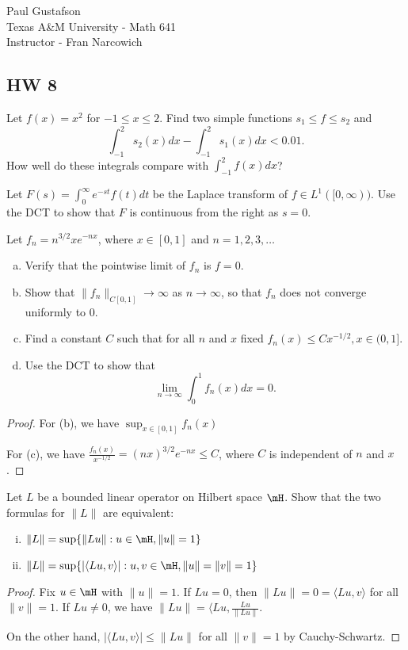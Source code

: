 \documentclass{article}
\begin{document}
\noindent Paul Gustafson\\
\noindent Texas A\&M University - Math 641\\ 
\noindent Instructor - Fran Narcowich

\subsection*{HW 8}
  Let $f(x) = x^2$ for $-1 \le x \le 2$. Find two simple functions $s_1 \le f \le s_2$ and
$$ \int_{-1}^2 s_2(x) dx - \int_{-1}^2 s_1(x) dx < 0.01.$$
How well do these integrals compare with $\int_{-1}^2 f(x)dx$?

 Let $F(s) = \int_0^\infty e^{-st} f(t) dt$ be the Laplace transform of $f \in L^1([0,\infty))$. Use the DCT to show that $F$ is continuous from the right as $s = 0$.

 Let $f_n = n^{3/2} x e^{-nx}$, where $x \in [0,1]$ and $n = 1,2,3, \ldots$
\begin{enumerate}[a.]
\item Verify that the pointwise limit of $f_n$ is $f = 0$.
\item Show that $\|f_n\|_{C[0,1]} \to \infty $ as $n \to \infty$, so that $f_n$ does not converge uniformly to $0$.
\item Find a constant $C$ such that for all $n$ and $x$ fixed $f_n(x) \le C x^{-1/2}, x \in (0,1]$.
\item Use the DCT to show that 
$$\lim_{n \to \infty} \int_0^1 f_n(x) dx = 0.$$
\end{enumerate}
\begin{proof}
For (b), we have $\sup_{x \in [0,1]} f_n(x)$  

For (c), we have $\frac {f_n(x)} {x^{-1/2}} = (nx)^{3/2} e^{-nx} \le C$, where $C$ is independent of $n$ and $x$.
\end{proof}

 Let $L$ be a bounded linear operator on Hilbert space $\mH$. Show that the two formulas for $\|L\|$ are equivalent:
\begin{enumerate}[i.]
\item $\|L\| = \sup\{\|Lu\| : u \in \mH, \|u\| = 1\}$
\item $\|L\| = \sup\{|\langle Lu, v \rangle| : u, v \in \mH, \|u\| = \|v\| = 1 \}$
\end{enumerate}

\begin{proof}
Fix $u \in \mH$ with $\|u\| = 1$.  If $Lu = 0$, then $\|Lu\| = 0 = \langle Lu, v \rangle$ for all $\|v\| = 1$. If $Lu \neq 0$, we have $\|Lu\| = \langle Lu, \frac {Lu} {\|Lu\|}$.

On the other hand, $|\langle Lu, v \rangle| \le \|Lu\|$ for all $\|v\| = 1$ by Cauchy-Schwartz.
\end{proof}
\end{document}
